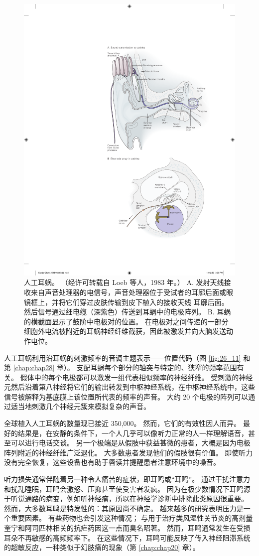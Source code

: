 \begin{figure}[htbp]
	\centering
	\includegraphics[width=0.7\linewidth]{chap26/fig_26_19}
	\caption{人工耳蜗。 （经许可转载自 Loeb 等人，1983 年。） A. 发射天线接收来自声音处理器的电信号，声音处理器位于受试者的耳廓后面或眼镜框上，并将它们穿过皮肤传输到皮下植入的接收天线 耳廓后面。 然后信号通过细电缆（深紫色）传送到耳蜗中的电极阵列。 B. 耳蜗的横截面显示了鼓阶中电极对的位置。 在电极对之间传递的一部分细胞外电流被附近的耳蜗神经纤维截获，因此被激发并向大脑发送动作电位。}
	\label{fig:26_19}
\end{figure}

人工耳蜗利用沿耳蜗的刺激频率的音调主题表示——位置代码（图 \ref{fig:26_11} 和第 \ref{chap:chap28} 章）。 支配耳蜗每个部分的轴突与特定的、狭窄的频率范围有关。 假体中的每个电极都可以激发一组代表相似频率的神经纤维。 受刺激的神经元然后沿着第八神经将它们的输出转发到中枢神经系统，在中枢神经系统中，这些信号被解释为基底膜上该位置所代表的频率的声音。 大约 20 个电极的阵列可以通过适当地刺激几个神经元簇来模拟复杂的声音。

全球植入人工耳蜗的数量现已接近 350,000。 然而，它们的有效性因人而异。 最好的结果是，在安静的条件下，一个人几乎可以像听力正常的人一样理解语音，甚至可以进行电话交谈。 另一个极端是从假肢中获益甚微的患者，大概是因为电极阵列附近的神经纤维广泛退化。 大多数患者发现他们的假肢很有价值。 即使听力没有完全恢复，这些设备也有助于唇读并提醒患者注意环境中的噪音。

听力损失通常伴随着另一种令人痛苦的症状，即耳鸣或“耳鸣”。 通过干扰注意力和扰乱睡眠，耳鸣会激怒、压抑甚至使受害者发疯。 因为在极少数情况下耳鸣源于听觉通路的病变，例如听神经瘤，所以在神经学诊断中排除此类原因很重要。 然而，大多数耳鸣是特发性的：其原因尚不确定。 越来越多的研究表明压力是一个重要因素。 有些药物也会引发这种情况； 与用于治疗类风湿性关节炎的高剂量奎宁和阿司匹林相关的抗疟药因这一点而臭名昭著。 然而，耳鸣通常发生在受损耳朵不再敏感的高频频率下。 在这些情况下，耳鸣可能反映了传入神经阻滞系统的超敏反应，一种类似于幻肢痛的现象（第 \ref{chap:chap20} 章）。


